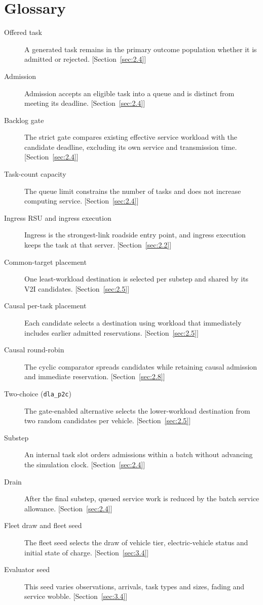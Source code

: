 \documentclass[12pt,a4paper]{article}
\begin{document}
\section*{Glossary}
{\small\singlespacing
\begin{description}
\item[Offered task] A generated task remains in the primary outcome population whether it is admitted or rejected. [Section~\ref{sec:2.4}]
\item[Admission] Admission accepts an eligible task into a queue and is distinct from meeting its deadline. [Section~\ref{sec:2.4}]
\item[Backlog gate] The strict gate compares existing effective service workload with the candidate deadline, excluding its own service and transmission time. [Section~\ref{sec:2.4}]
\item[Task-count capacity] The queue limit constrains the number of tasks and does not increase computing service. [Section~\ref{sec:2.4}]
\item[Ingress RSU and ingress execution] Ingress is the strongest-link roadside entry point, and ingress execution keeps the task at that server. [Section~\ref{sec:2.2}]
\item[Common-target placement] One least-workload destination is selected per substep and shared by its V2I candidates. [Section~\ref{sec:2.5}]
\item[Causal per-task placement] Each candidate selects a destination using workload that immediately includes earlier admitted reservations. [Section~\ref{sec:2.5}]
\item[Causal round-robin] The cyclic comparator spreads candidates while retaining causal admission and immediate reservation. [Section~\ref{sec:2.8}]
\item[Two-choice (\texttt{dla\_p2c})] The gate-enabled alternative selects the lower-workload destination from two random candidates per vehicle. [Section~\ref{sec:2.5}]
\item[Substep] An internal task slot orders admissions within a batch without advancing the simulation clock. [Section~\ref{sec:2.4}]
\item[Drain] After the final substep, queued service work is reduced by the batch service allowance. [Section~\ref{sec:2.4}]
\item[Fleet draw and fleet seed] The fleet seed selects the draw of vehicle tier, electric-vehicle status and initial state of charge. [Section~\ref{sec:3.4}]
\item[Evaluator seed] This seed varies observations, arrivals, task types and sizes, fading and service wobble. [Section~\ref{sec:3.4}]

\end{description}}
\end{document}
